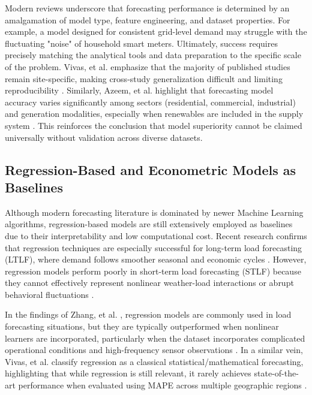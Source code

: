 \documentclass[conference]{IEEEtran}
\begin{document}
Modern reviews underscore that forecasting performance is determined by an amalgamation of model type, feature engineering, and dataset properties. For example, a model designed for consistent grid-level demand may struggle with the fluctuating "noise" of household smart meters. Ultimately, success requires precisely matching the analytical tools and data preparation to the specific scale of the problem. Vivas, et al. \cite{vivas2020} emphasize that the majority of published studies remain site-specific, making cross-study generalization difficult and limiting reproducibility \cite{vivas2020}. Similarly, Azeem, et al. \cite{azeem2021} highlight that forecasting model accuracy varies significantly among sectors (residential, commercial, industrial) and generation modalities, especially when renewables are included in the supply system \cite{azeem2021}. This reinforces the conclusion that model superiority cannot be claimed universally without validation across diverse datasets.

\subsection{Regression-Based and Econometric Models as Baselines}

Although modern forecasting literature is dominated by newer Machine Learning algorithms, regression-based models are still extensively employed as baselines due to their interpretability and low computational cost. Recent research confirms that regression techniques are especially successful for long-term load forecasting (LTLF), where demand follows smoother seasonal and economic cycles \cite{hammad2020} . However, regression models perform poorly in short-term load forecasting (STLF) because they cannot effectively represent nonlinear weather-load interactions or abrupt behavioral fluctuations \cite{habbak2023,khalil2022}.

In the findings of Zhang, et al. \cite{zhang2021}, regression models are commonly used in load forecasting situations, but they are typically outperformed when nonlinear learners are incorporated, particularly when the dataset incorporates complicated operational conditions and high-frequency sensor observations \cite{zhang2021}. In a similar vein, Vivas, et al. \cite{vivas2020} classify regression as a classical statistical/mathematical forecasting, highlighting that while regression is still relevant, it rarely achieves state-of-the-art performance when evaluated using MAPE across multiple geographic regions \cite{vivas2020}.
\end{document}
